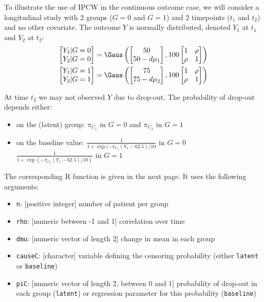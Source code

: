 \documentclass[12pt]{article}
\begin{document}
To illustrate the use of IPCW in the continuous outcome case, we will
consider a longitudinal study with 2 groups (\(G=0\) and \(G=1\)) and
2 timepoints (\(t_1\) and \(t_2\)) and no other covariate. The outcome
\(Y\) is normally distributed, denoted \(Y_1\) at \(t_1\) and \(Y_2\)
at \(t_2\):
\begin{align*}
\begin{bmatrix}
Y_1 | G=0 \\ Y_2 |G=0
\end{bmatrix} &= \Gaus\left(
\begin{bmatrix}
50 \\ 50-d\mu_1
\end{bmatrix},100 \begin{bmatrix}
1 & \rho \\ \rho & 1
\end{bmatrix}
\right) \\
\begin{bmatrix}
Y_1 | G=1 \\ Y_2 |G=1
\end{bmatrix} &= \Gaus\left(
\begin{bmatrix}
75 \\ 75-d\mu_2
\end{bmatrix},100 \begin{bmatrix}
1 & \rho \\ \rho & 1
\end{bmatrix}
\right)
\end{align*}

At time \(t_2\) we may not observed \(Y\) due to drop-out. The
probability of drop-out depends either:
\begin{itemize}
\item on the (latent) group: \(\pi_{C_1}\) in \(G=0\) and \(\pi_{C_2}\) in \(G=1\)
\item on the baseline value: \(\frac{1}{1+\exp(-\pi_{C_1}(Y_1-62.5)/10}\) in \(G=0\) \newline \hphantom{on the basleine value:} \(\frac{1}{1+\exp(-\pi_{C_2}(Y_1-62.5)/10)}\) in \(G=1\)
\end{itemize}

\bigskip

The corresponding R function is given in the next page. It uses the following arguments:
\begin{itemize}
\item \texttt{n}: [positive integer] number of patient per group
\item \texttt{rho}: [numeric between -1 and 1] correlation over time
\item \texttt{dmu}: [numeric vector of length 2] change in mean in each group
\item \texttt{causeC}: [character] variable defining the censoring probability \newline (either \texttt{latent} or \texttt{baseline})
\item \texttt{piC}: [numeric vector of length 2, between 0 and 1] probability of drop-out in each group (\texttt{latent}) or regression parameter for this probability (\texttt{baseline})
\end{itemize}
\end{document}
